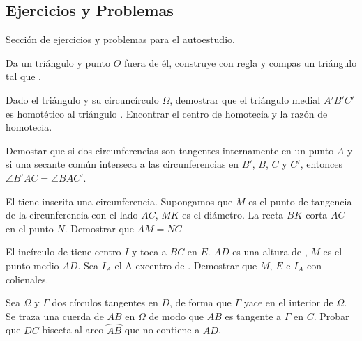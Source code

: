 \subsection{Ejercicios y Problemas}

Sección de ejercicios y problemas para el autoestudio.

\begin{section-exercise}
    Da un triángulo  y punto $O$ fuera de él, construye con regla y compas un triángulo  tal que .
\end{section-exercise}


\begin{section-problem}
    Dado el triángulo  y su circuncírculo $\Omega$, demostrar que el triángulo medial $A' B' C'$ es homotético al triángulo .
    Encontrar el centro de homotecia y la razón de homotecia.
\end{section-problem}

\begin{section-problem}
    Demostar que si dos circunferencias son tangentes internamente en un punto $A$ y si una secante común interseca a las circunferencias en $B'$, $B$, $C$ y $C'$, entonces $\angle B' AC = \angle BAC'$.
\end{section-problem}

\begin{section-problem}
    El  tiene inscrita una circunferencia.
    Supongamos que $M$ es el punto de tangencia de la circunferencia con el lado $AC$, $MK$ es el diámetro.
    La recta $BK$ corta $AC$ en el punto $N$.
    Demostrar que $AM = NC$
\end{section-problem}

\begin{section-problem}
    El incírculo de  tiene centro $I$ y toca a $BC$ en $E$.
    $AD$ es una altura de , $M$ es el punto medio $AD$.
    Sea $I_A$ el A-excentro de .
    Demostrar que $M$, $E$ e $I_A$ con colienales.
\end{section-problem}

\begin{section-problem}
    Sea $\Omega$ y $\Gamma$ dos círculos tangentes en $D$, de forma que $\Gamma$ yace en el interior de $\Omega$.
    Se traza una cuerda de $AB$ en $\Omega$ de modo que $AB$ es tangente a $\Gamma$ en $C$.
    Probar que $DC$ bisecta al arco $\wideparen{AB}$ que no contiene a $AD$.
\end{section-problem}